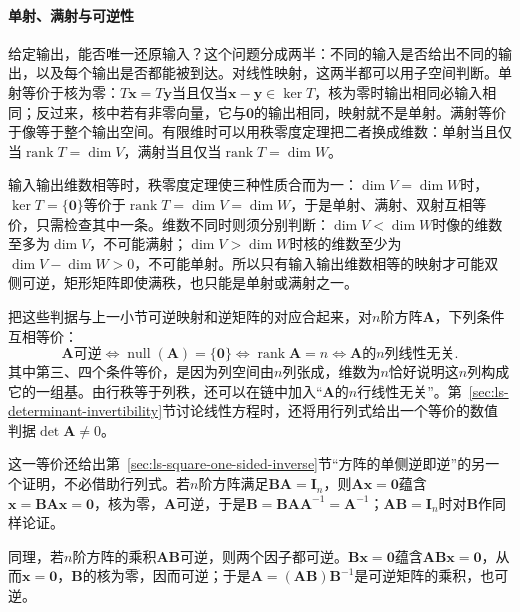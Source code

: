 \paragraph{单射、满射与可逆性}
\label{sec:ls-injective-surjective-invertible}
给定输出，能否唯一还原输入？这个问题分成两半：不同的输入是否给出不同的输出，以及每个输出是否都能被到达。对线性映射，这两半都可以用子空间判断。单射等价于核为零：$T\bm x=T\bm y$当且仅当$\bm x-\bm y\in\ker T$，核为零时输出相同必输入相同；反过来，核中若有非零向量，它与$\bm0$的输出相同，映射就不是单射。满射等价于像等于整个输出空间。有限维时可以用秩零度定理把二者换成维数：单射当且仅当$\operatorname{rank}T=\dim V$，满射当且仅当$\operatorname{rank}T=\dim W$。

输入输出维数相等时，秩零度定理使三种性质合而为一：$\dim V=\dim W$时，$\ker T=\{\bm0\}$等价于$\operatorname{rank}T=\dim V=\dim W$，于是单射、满射、双射互相等价，只需检查其中一条。维数不同时则须分别判断：$\dim V<\dim W$时像的维数至多为$\dim V$，不可能满射；$\dim V>\dim W$时核的维数至少为$\dim V-\dim W>0$，不可能单射。所以只有输入输出维数相等的映射才可能双侧可逆，矩形矩阵即使满秩，也只能是单射或满射之一。

把这些判据与上一小节可逆映射和逆矩阵的对应合起来，对$n$阶方阵$\bm A$，下列条件互相等价：
\[
 \bm A\text{可逆}
 \iff\operatorname{null}(\bm A)=\{\bm0\}
 \iff\operatorname{rank}\bm A=n
 \iff\bm A\text{的}n\text{列线性无关}.
\]
其中第三、四个条件等价，是因为列空间由$n$列张成，维数为$n$恰好说明这$n$列构成它的一组基。由行秩等于列秩，还可以在链中加入“$\bm A$的$n$行线性无关”。第~\ref{sec:ls-determinant-invertibility}节讨论线性方程时，还将用行列式给出一个等价的数值判据$\det\bm A\neq0$。

这一等价还给出第~\ref{sec:ls-square-one-sided-inverse}节“方阵的单侧逆即逆”的另一个证明，不必借助行列式。若$n$阶方阵满足$\bm B\bm A=\bm I_n$，则$\bm A\bm x=\bm0$蕴含$\bm x=\bm B\bm A\bm x=\bm0$，核为零，$\bm A$可逆，于是$\bm B=\bm B\bm A\bm A^{-1}=\bm A^{-1}$；$\bm A\bm B=\bm I_n$时对$\bm B$作同样论证。

同理，若$n$阶方阵的乘积$\bm A\bm B$可逆，则两个因子都可逆。$\bm B\bm x=\bm0$蕴含$\bm A\bm B\bm x=\bm0$，从而$\bm x=\bm0$，$\bm B$的核为零，因而可逆；于是$\bm A=(\bm A\bm B)\bm B^{-1}$是可逆矩阵的乘积，也可逆。

